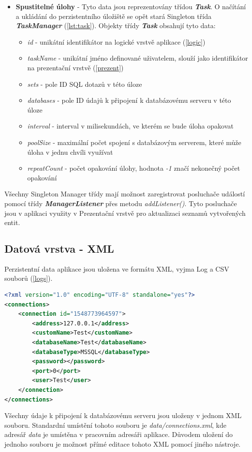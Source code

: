 \documentclass[czech,bachelor,public,dept460,male,cpdeclaration,twoside]{diploma}
\begin{document}
\begin{itemize}
  \item \textbf{Spustitelné úlohy} - Tyto data jsou reprezentovány třídou \textbf{\emph{Task}}. O načítání a ukládání do perzistentního úložiště se opět stará Singleton třída \textbf{\emph{TaskManager}} (\ref{lst:task}). Objekty třídy \textbf{\emph{Task}} obsahují tyto data:
    \begin{itemize}
  	\item \textit{id} - unikátní identifikátor na logické vrstvě aplikace (\ref{logic})
  	\item \textit{taskName} - unikátní jméno definované uživatelem, slouží jako identifikátor  na prezentační vrstvě (\ref{prezent})
  	\item \textit{sets} - pole ID SQL dotazů v této úloze
  	\item \textit{databases} - pole ID údajů k připojení k databázovému serveru v této úloze
  	\item \textit{interval} - interval v milisekundách, ve kterém se bude úloha opakovat
  	\item \textit{poolSize} - maximální počet spojení s databázovým serverem, které může úloha v jednu chvíli využívat
  	\item \textit{repeatCount} - počet opakování úlohy, hodnota \textit{-1} značí nekonečný počet opakování
    \end{itemize}
\end{itemize}

Všechny Singleton Manager třídy mají možnost zaregistrovat posluchače událostí pomocí třídy \textbf{\emph{ManagerListener}} přes metodu \textit{addListener()}. Tyto posluchače jsou v aplikaci využity v Prezentační vrstvě pro aktualizaci seznamů vytvořených entit.

\newpage
\subsection{Datová vrstva - XML} \label{xml}
Perzistentní data aplikace jsou uložena ve formátu XML, vyjma Log a CSV souborů (\ref{logs}).\newline

\begin{minipage}{\linewidth}
\begin{lstlisting}[caption=Údaje k připojení k databázovému serveru ve formátu XML\label{lst:con},language=XML] 
<?xml version="1.0" encoding="UTF-8" standalone="yes"?>
<connections>
    <connection id="1548773964597">
        <address>127.0.0.1</address>
        <customName>Test</customName>
        <databaseName>Test</databaseName>
        <databaseType>MSSQL</databaseType>
        <password></password>
        <port>0</port>
        <user>Test</user>
    </connection>
</connections>
\end{lstlisting}
Všechny údaje k připojení k databázovému serveru jsou uloženy v jednom XML souboru. Standardní umístění tohoto souboru je \textit{data/connections.xml}, kde adresář \textit{data} je umístěna v pracovním adresáři aplikace. Důvodem uložení do jednoho souboru je možnost přímé editace tohoto XML pomocí jiného nástroje.
\end{minipage}
\end{document}

